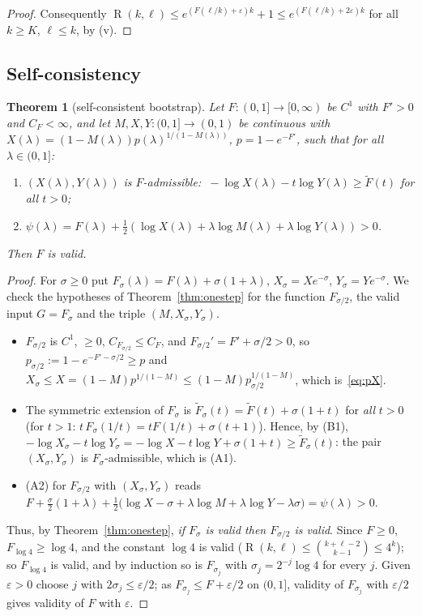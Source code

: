 \documentclass[11pt]{article}
\newtheorem{theorem}{Theorem}[section]
\theoremstyle{definition}
\newcommand{\Ft}{\widetilde F}
\newcommand{\eps}{\varepsilon}
\newcommand{\lam}{\lambda}
\DeclareMathOperator{\Ram}{R}
\begin{document}
\begin{proof}
\smallskip
Consequently $\Ram(k,\ell)\le e^{(F(\ell/k)+\eps)k}+1\le e^{(F(\ell/k)+2\eps)k}$ for all $k\ge K$, $\ell\le k$, by (v).
\end{proof}

\subsection{Self-consistency}

\begin{theorem}[self-consistent bootstrap]\label{thm:selfconsistent}
Let $F\colon(0,1]\to[0,\infty)$ be $C^1$ with $F'>0$ and $C_F<\infty$, and let $M,X,Y\colon(0,1]\to(0,1)$ be continuous with $X(\lam)=(1-M(\lam))p(\lam)^{1/(1-M(\lam))}$, $p=1-e^{-F'}$, such that for all $\lam\in(0,1]$:
\begin{enumerate}[label=\textup{(B\arabic*)},leftmargin=3em]
\item $(X(\lam),Y(\lam))$ is $F$-admissible: $\ -\log X(\lam)-t\log Y(\lam)\ge\Ft(t)$ for all $t>0$;
\item $\psi(\lam)=F(\lam)+\frac12(\log X(\lam)+\lam\log M(\lam)+\lam\log Y(\lam))>0$.
\end{enumerate}
Then $F$ is valid.
\end{theorem}

\begin{proof}
For $\sigma\ge0$ put $F_\sigma(\lam)=F(\lam)+\sigma(1+\lam)$, $X_\sigma=Xe^{-\sigma}$, $Y_\sigma=Ye^{-\sigma}$.  We check the hypotheses of Theorem~\ref{thm:onestep} for the function $F_{\sigma/2}$, the valid input $G=F_\sigma$ and the triple $(M,X_\sigma,Y_\sigma)$.
\begin{itemize}[leftmargin=2em]
\item $F_{\sigma/2}$ is $C^1$, $\ge0$, $C_{F_{\sigma/2}}\le C_F$, and $F_{\sigma/2}'=F'+\sigma/2>0$, so $p_{\sigma/2}:=1-e^{-F'-\sigma/2}\ge p$ and
$X_\sigma\le X=(1-M)p^{1/(1-M)}\le(1-M)p_{\sigma/2}^{1/(1-M)}$, which is~\eqref{eq:pX}.
\item The symmetric extension of $F_\sigma$ is $\Ft_\sigma(t)=\Ft(t)+\sigma(1+t)$ for \emph{all} $t>0$ (for $t>1$: $t\,F_\sigma(1/t)=t F(1/t)+\sigma(t+1)$).  Hence, by (B1),
$-\log X_\sigma-t\log Y_\sigma=-\log X-t\log Y+\sigma(1+t)\ge\Ft_\sigma(t)$: the pair $(X_\sigma,Y_\sigma)$ is $F_\sigma$-admissible, which is (A1).
\item (A2) for $F_{\sigma/2}$ with $(X_\sigma,Y_\sigma)$ reads
$F+\tfrac\sigma2(1+\lam)+\tfrac12\bigl(\log X-\sigma+\lam\log M+\lam\log Y-\lam\sigma\bigr)=\psi(\lam)>0$.
\end{itemize}
Thus, by Theorem~\ref{thm:onestep}, \emph{if $F_\sigma$ is valid then $F_{\sigma/2}$ is valid}.  Since $F\ge0$, $F_{\log4}\ge\log4$, and the constant $\log4$ is valid ($\Ram(k,\ell)\le\binom{k+\ell-2}{k-1}\le4^k$); so $F_{\log4}$ is valid, and by induction so is $F_{\sigma_j}$ with $\sigma_j=2^{-j}\log4$ for every $j$.  Given $\eps>0$ choose $j$ with $2\sigma_j\le\eps/2$; as $F_{\sigma_j}\le F+\eps/2$ on $(0,1]$, validity of $F_{\sigma_j}$ with $\eps/2$ gives validity of $F$ with $\eps$.
\end{proof}
\end{document}
